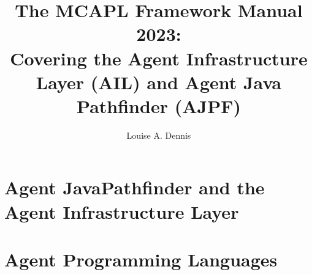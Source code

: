\documentclass[a4]{book}
\author{Louise A. Dennis}
\title{The MCAPL Framework Manual 2023: \\
Covering the Agent Infrastructure Layer (AIL) and Agent Java Pathfinder (AJPF)}
\begin{document}
\maketitle

\tableofcontents

\SetJava






\part{Agent JavaPathfinder and the Agent Infrastructure Layer}







\part{Agent Programming Languages}













\printindex
\end{document}

